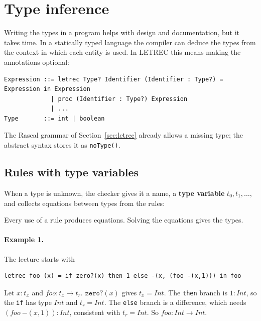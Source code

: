 \section{Type inference}
\label{sec:inference}

Writing the types in a program helps with design and documentation, but it
takes time. In a statically typed language the compiler can deduce the types
from the context in which each entity is used. In LETREC this means making the
annotations optional:
\begin{lstlisting}
Expression ::= letrec Type? Identifier (Identifier : Type?) = Expression in Expression
             | proc (Identifier : Type?) Expression
             | ...
Type       ::= int | boolean
\end{lstlisting}
The Rascal grammar of Section~\ref{sec:letrec} already allows a missing type;
the abstract syntax stores it as \texttt{noType()}.

\subsection{Rules with type variables}

When a type is unknown, the checker gives it a name, a \textbf{type variable}
$t_0, t_1, \dots$, and collects equations between types from the rules:
Every use of a rule produces equations. Solving the equations gives the
types.

\paragraph{Example 1.} The lecture starts with
\begin{lstlisting}
letrec foo (x) = if zero?(x) then 1 else -(x, (foo -(x,1))) in foo
\end{lstlisting}
Let $x : t_x$ and $\mathit{foo} : t_x \to t_r$. $\mathtt{zero?}(x)$ gives $t_x = \mathit{Int}$.
The \texttt{then} branch is $1 : \mathit{Int}$, so the \texttt{if} has type
$\mathit{Int}$ and $t_r = \mathit{Int}$. The \texttt{else} branch is a difference,
which needs $(\mathit{foo}\ \mathtt{-}(x,1)) : \mathit{Int}$, consistent with
$t_r = \mathit{Int}$. So $\mathit{foo} : \mathit{Int} \to \mathit{Int}$.

